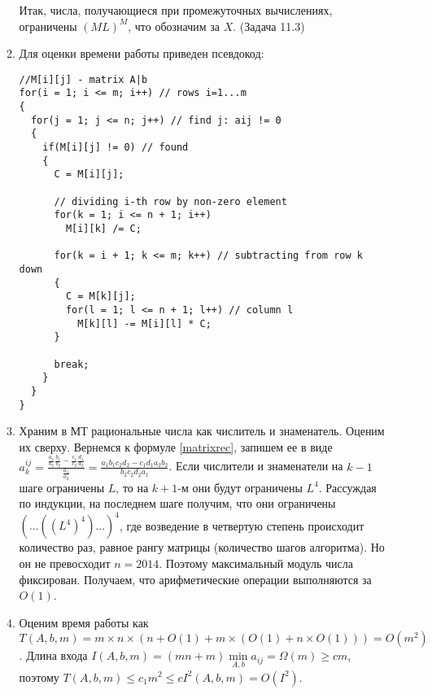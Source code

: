 \documentclass[a4paper]{article}
\begin{document}
\begin{enumerate}
\begin{enumerate}
Итак, числа, получающиеся при промежуточных вычислениях, ограничены $(ML)^M$, что обозначим за $X$. (Задача 11.3)
\item Для оценки времени работы приведен псевдокод:\newline
{}

%
%

\begin{lstlisting}
//M[i][j] - matrix A|b
for(i = 1; i <= m; i++) // rows i=1...m
{
  for(j = 1; j <= n; j++) // find j: aij != 0
  {
    if(M[i][j] != 0) // found
    {
      C = M[i][j];

      // dividing i-th row by non-zero element
      for(k = 1; i <= n + 1; i++)
        M[i][k] /= C;

      for(k = i + 1; k <= m; k++) // subtracting from row k down
      {
        C = M[k][j];
        for(l = 1; l <= n + 1; l++) // column l
          M[k][l] -= M[i][l] * C;
      }
      
      break;
    }
  }
}
\end{lstlisting}
\item Храним в МТ рациональные числа как числитель и знаменатель. Оценим их сверху. Вернемся к формуле \ref{matrixrec}, запишем ее в виде $a_k^{ij}=\frac{\frac{a_1}{a_2}\frac{b_1}{b_2}-\frac{c_1}{c_2}\frac{d_1}{d_2}}{\frac{a_1}{a_2}}=\frac{a_1b_1c_2d_2-c_1d_1a_2b_2}{b_2c_2d_2a_1}$. Если числители и знаменатели на $k-1$ шаге ограничены $L$, то на $k+1$-м они будут ограничены $L^4$. Рассуждая по индукции, на последнем шаге получим, что они ограничены $(...((L^4)^4)...)^4$, где возведение в четвертую степень происходит количество раз, равное рангу матрицы (количество шагов алгоритма). Но он не превосходит $n=2014$. Поэтому максимальный модуль числа фиксирован. Получаем, что арифметические операции выполняются за $O(1)$.
\item Оценим время работы как $T(A,b,m)=m\times n\times (n + O(1) + m \times (O(1) + n \times O(1)))=O(m^2)$. Длина входа $I(A,b,m)=(mn+m)\min\limits_{A,b} a_{ij}=\Omega(m)\geqslant cm$, поэтому $T(A,b,m)\leqslant c_1m^2\leqslant cI^2(A,b,m)=O(I^2)$.
\end{enumerate}
\newpage

\end{enumerate}
\end{document}
